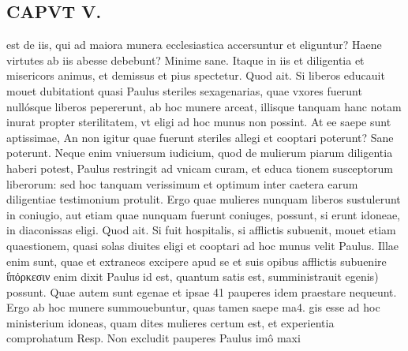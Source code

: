 \documentclass{article}
\begin{document}
\begin{pages}
\section*{CAPVT  V. }
\marginpar{[ p.273 ]}\pstart est de iis, qui ad maiora munera ecclesiastica accersuntur et eliguntur? Haene virtutes ab iis abesse debebunt? Minime sane. Itaque in iis et diligentia et misericors animus, et demissus et pius spectetur.  \pend\pstart Quod ait. Si liberos educauit mouet dubitationt quasi Paulus steriles sexagenarias, quae vxores fuerunt nullósque liberos pepererunt, ab hoc munere arceat, illisque tanquam hanc notam inurat propter sterilitatem, vt eligi ad hoc munus non possint. At ee saepe sunt aptissimae, An non igitur quae fuerunt steriles allegi et cooptari poterunt? Sane poterunt. Neque enim vniuersum iudicium, quod de mulierum piarum diligentia haberi potest, Paulus restringit ad vnicam curam, et educa tionem susceptorum liberorum: sed hoc tanquam verissimum et optimum inter caetera earum diligentiae testimonium protulit. Ergo quae mulieres nunquam liberos sustulerunt in coniugio, aut etiam quae nunquam fuerunt coniuges, possunt, si erunt idoneae, in diaconissas eligi.  \pend\pstart  Quod ait. Si fuit hospitalis, si afflictis subuenit, mouet etiam quaestionem, quasi solas diuites eligi et cooptari ad hoc munus velit Paulus. Illae enim sunt, quae et extraneos excipere apud se et suis opibus afflictis subuenire ἱ̓πόρκεσιν enim dixit Paulus id est, quantum satis est, sumministrauit egenis) possunt. Quae autem sunt egenae et ipsae 41 pauperes idem praestare nequeunt. Ergo ab hoc munere summouebuntur, quas tamen saepe ma4. gis esse ad hoc ministerium idoneas, quam dites mulieres certum est, et experientia comprohatum Resp. Non excludit pauperes Paulus imô maxi\pend

\end{pages}
\end{document}
